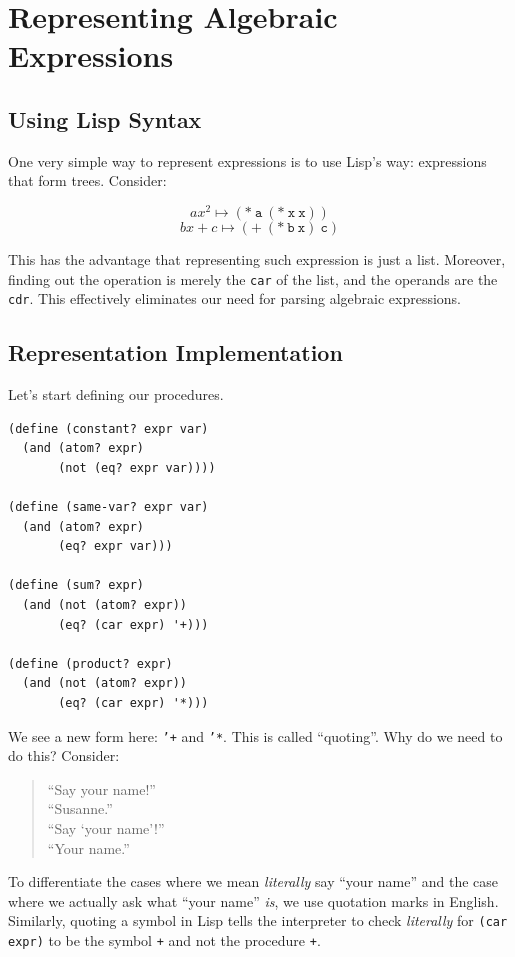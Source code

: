 \documentclass[9pt]{report}
\begin{document}
\section{Representing Algebraic Expressions}
\label{sec:orgd763ace}

\subsection{Using Lisp Syntax}
\label{sec:org69c1678}

One very simple way to represent expressions is to use Lisp's way:
expressions that form trees. Consider:

$$ax^{2} \mapsto \mathtt{(*~a~(*~x~x))}$$ $$bx+c \mapsto \mathtt{(
    \mathtt{+} ~(*~b~x)~c)}$$

This has the advantage that representing such expression is just a
list. Moreover, finding out the operation is merely the \texttt{car} of
the list, and the operands are the \texttt{cdr}. This effectively
eliminates our need for parsing algebraic expressions.

\subsection{Representation Implementation}
\label{sec:org73a44f9}

Let's start defining our procedures.

\begin{verbatim}
(define (constant? expr var)
  (and (atom? expr)
       (not (eq? expr var))))

(define (same-var? expr var)
  (and (atom? expr)
       (eq? expr var)))

(define (sum? expr)
  (and (not (atom? expr))
       (eq? (car expr) '+)))

(define (product? expr)
  (and (not (atom? expr))
       (eq? (car expr) '*)))
\end{verbatim}

We see a new form here: \texttt{'+} and \texttt{'*}. This is called ``quoting''.
Why do we need to do this? Consider:

\begin{verse}
``Say your name!''\\
``Susanne.''\\
``Say `your name'!''\\
``Your name.''\\
\end{verse}

To differentiate the cases where we mean \emph{literally} say ``your
name'' and the case where we actually ask what ``your name'' \emph{is}, we
use quotation marks in English. Similarly, quoting a symbol in
Lisp tells the interpreter to check \emph{literally} for \texttt{(car expr)}
to be the symbol \texttt{+} and not the procedure \texttt{+}.
\end{document}
